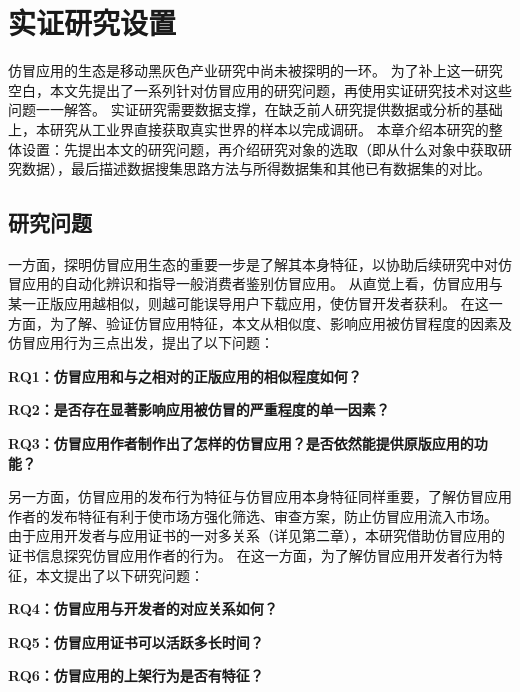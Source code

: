 \chapter{实证研究设置}
\label{chp:research_settings}

仿冒应用的生态是移动黑灰色产业研究中尚未被探明的一环。
为了补上这一研究空白，本文先提出了一系列针对仿冒应用的研究问题，再使用实证研究技术对这些问题一一解答。
实证研究需要数据支撑，在缺乏前人研究提供数据或分析的基础上，本研究从工业界直接获取真实世界的样本以完成调研。
本章介绍本研究的整体设置：先提出本文的研究问题，再介绍研究对象的选取（即从什么对象中获取研究数据），最后描述数据搜集思路方法与所得数据集和其他已有数据集的对比。


\section{研究问题}

一方面，探明仿冒应用生态的重要一步是了解其本身特征，以协助后续研究中对仿冒应用的自动化辨识和指导一般消费者鉴别仿冒应用。
从直觉上看，仿冒应用与某一正版应用越相似，则越可能误导用户下载应用，使仿冒开发者获利。
在这一方面，为了解、验证仿冒应用特征，本文从相似度、影响应用被仿冒程度的因素及仿冒应用行为三点出发，提出了以下问题：

\textbf{RQ1：仿冒应用和与之相对的正版应用的相似程度如何？}

\textbf{RQ2：是否存在显著影响应用被仿冒的严重程度的单一因素？}

\textbf{RQ3：仿冒应用作者制作出了怎样的仿冒应用？是否依然能提供原版应用的功能？}

另一方面，仿冒应用的发布行为特征与仿冒应用本身特征同样重要，了解仿冒应用作者的发布特征有利于使市场方强化筛选、审查方案，防止仿冒应用流入市场。
由于应用开发者与应用证书的一对多关系（详见第二章），本研究借助仿冒应用的证书信息探究仿冒应用作者的行为。
在这一方面，为了解仿冒应用开发者行为特征，本文提出了以下研究问题：

\textbf{RQ4：仿冒应用与开发者的对应关系如何？}

\textbf{RQ5：仿冒应用证书可以活跃多长时间？}

\textbf{RQ6：仿冒应用的上架行为是否有特征？}


